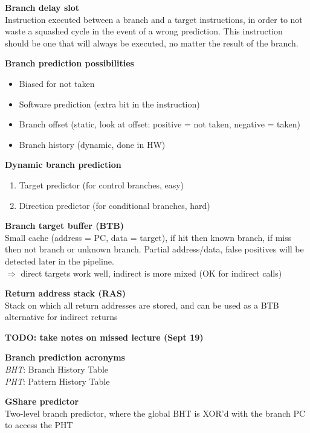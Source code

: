\documentclass[10pt,letterpaper,landscape]{report}
\newcommand{\boxheight}{21.59cm}
\newcommand{\boxwidth}{8.85cm}
\begin{document}
\begin{small}
{\begin{minipage}[t][\boxheight][c]{\boxwidth}
    \textbf{Branch delay slot}\\
    Instruction executed between a branch and a target instructions, in order to not waste a squashed cycle in the event of a wrong prediction. This instruction should be one that will always be executed, no matter the result of the branch.
    
    \textbf{Branch prediction possibilities}
    \begin{itemize}
        \item Biased for not taken
        \item Software prediction (extra bit in the instruction)
        \item Branch offset (static, look at offset: positive = not taken, negative = taken)
        \item Branch history (dynamic, done in HW)
    \end{itemize}
    
    \textbf{Dynamic branch prediction}
    \begin{enumerate}
        \item Target predictor (for control branches, easy)
        \item Direction predictor (for conditional branches, hard)
    \end{enumerate}
    
    \textbf{Branch target buffer (BTB)}\\
    Small cache (address = PC, data = target), if hit then known branch, if miss then not branch or unknown branch. Partial address/data, false positives will be detected later in the pipeline.\\
    $\Rightarrow$ direct targets work well, indirect is more mixed (OK for indirect calls)
    
    \textbf{Return address stack (RAS)}\\
    Stack on which all return addresses are stored, and can be used as a BTB alternative for indirect returns
    
    \textbf{TODO: take notes on missed lecture (Sept 19)}
    
    \textbf{Branch prediction acronyms}\\
    \textit{BHT}: Branch History Table\\
    \textit{PHT}: Pattern History Table
    
    \textbf{GShare predictor}\\
    Two-level branch predictor, where the global BHT is XOR'd with the branch PC to access the PHT
    

\end{minipage}}
\end{small}
\end{document}
